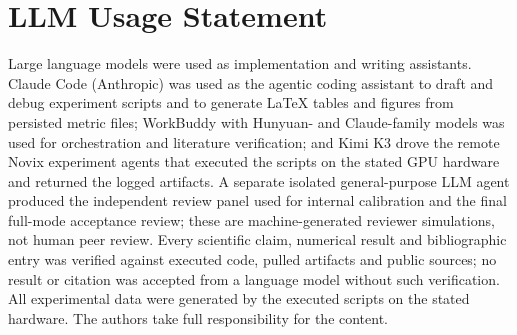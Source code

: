 \documentclass[10pt,twocolumn,letterpaper]{article}
\begin{document}
\section*{LLM Usage Statement}
Large language models were used as implementation and writing assistants.
Claude Code (Anthropic) was used as the agentic coding assistant to draft and
debug experiment scripts and to generate LaTeX tables and figures from
persisted metric files; WorkBuddy with Hunyuan- and Claude-family models was
used for orchestration and literature verification; and Kimi K3 drove the
remote Novix experiment agents that executed the scripts on the stated GPU
hardware and returned the logged artifacts. A separate isolated
general-purpose LLM agent produced the independent review panel used for
internal calibration and the final full-mode acceptance review; these are
machine-generated reviewer simulations, not human peer review. Every
scientific claim, numerical result and bibliographic entry was verified
against executed code, pulled artifacts and public sources; no result or
citation was accepted from a language model without such verification. All
experimental data were generated by the executed scripts on the stated
hardware. The authors take full responsibility for the content.

{
\footnotesize


}
\end{document}
